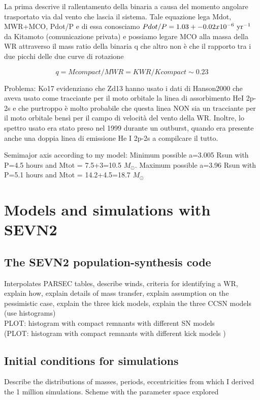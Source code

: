 \documentclass[a4paper,titlepage]{book}     	%
\newcommand{\sun}{\ensuremath{_\odot}}
\newcommand{\msun}{\ensuremath{M\sun}}
\begin{document}
La prima descrive il rallentamento della binaria a causa del momento angolare trasportato via dal vento che lascia il sistema. Tale equazione lega Mdot, MWR+MCO, Pdot/P e di essa conosciamo $Pdot/P = 1.03+- 0.02 x 10^{-6} ~ \rm yr^{-1}$ da Kitamoto (comunicazione privata) e possiamo legare MCO alla massa della WR attraverso il mass ratio della binaria q che altro non è che il rapporto tra i due picchi delle due curve di rotazione

\[q = Mcompact/MWR = KWR / Kcompact \sim 0.23\] 

Problema: Ko17 evidenziano che Zd13 hanno usato i dati di Hanson2000 che aveva usato come tracciante per il moto orbitale la linea di assorbimento HeI 2p-2s e che purtroppo è molto probabile che questa linea NON sia un tracciante per il moto orbitale bensì per il campo di velocità del vento della WR. Inoltre, lo spettro usato era stato preso nel 1999 durante un outburst, quando era presente anche una doppia linea di emissione He I 2p-2s a compilcare il tutto. 




Semimajor axis according to my model: Minimum possible a=3.005 Rsun with P=4.5 hours and Mtot = 7.5+3=10.5 \msun .  Maximum possible a=3.96 Rsun with P=5.1 hours and Mtot = 14.2+4.5=18.7 \msun 


\chapter{Models and simulations with SEVN2}
\section{The SEVN2 population-synthesis code}
Interpolates PARSEC tables, describe winds, criteria for identifying a WR, explain how, explain details of mass transfer, explain assumption on the pessimistic case, explain the three kick models, explain the three CCSN models (use histograms)\\
PLOT: histogram with compact remnants with different SN models\\
(PLOT: histogram with compact remnants with different kick models )

\section{Initial conditions for simulations}
Describe the distributions of masses, periods, eccentricities from which I derived the 1 million simulations. Scheme with the parameter space explored
\end{document}
